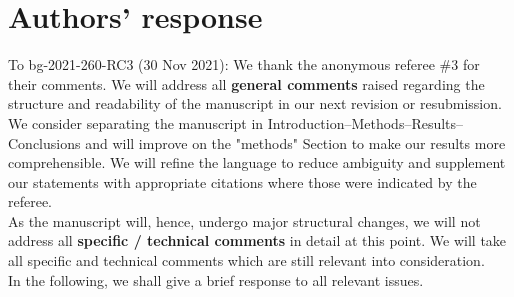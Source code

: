 \documentclass{scrartcl}
\begin{document}
\section*{Authors' response}
To bg-2021-260-RC3 (30 Nov 2021):
We thank the anonymous referee \#3 for their comments.
We will address all \textbf{general comments} raised regarding the structure and readability of the manuscript in our next revision or resubmission. We consider separating the manuscript in Introduction--Methods--Results--Conclusions and will improve on the "methods" Section to make our results more comprehensible. We will refine the language to reduce ambiguity and supplement our statements with appropriate citations where those were indicated by the referee.\\
As the manuscript will, hence, undergo major structural changes, we will not address all \textbf{specific / technical comments} in detail at this point. We will take all specific and technical comments which are still relevant into consideration.\\
In the following, we shall give a brief response to all relevant issues.
\end{document}
